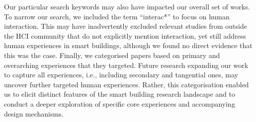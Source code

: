 Our particular search keywords may also have impacted our overall set of works. To narrow our search, we included the term ``interac*'' to focus on human interaction. This may have inadvertently excluded relevant studies from outside the HCI community that do not explicitly mention interaction, yet still address human experiences in smart buildings, although we found no direct evidence that this was the case. Finally, we categorised papers based on primary and overarching experiences that they targeted. Future research expanding our work to capture all experiences, i.e., including secondary and tangential ones, may uncover further targeted human experiences. Rather, this categorisation enabled us to elicit distinct features of the smart building research landscape and to conduct a deeper exploration of specific core experiences and accompanying design mechanisms. 
